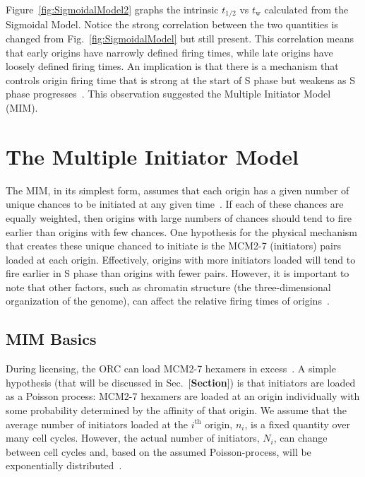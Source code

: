 {	Figure~\ref{fig:SigmoidalModel2} graphs the intrinsic $t_{1/2}$ vs $t_{\text{w}}$ calculated from the Sigmoidal Model.
	Notice the strong correlation between the two quantities is changed from Fig.~\ref{fig:SigmoidalModel} but still present.
	This correlation means that early origins have narrowly defined firing times, while late origins have loosely defined firing times.
	An implication is that there is a mechanism that controls origin firing time that is strong at the start of S phase but weakens as S phase progresses~\cite{ScottsThesis}.
	This observation suggested the Multiple Initiator Model (MIM).
	
	
	
	\section{The Multiple Initiator Model}
	\label{sec:MIM}
	
	The MIM, in its simplest form, assumes that each origin has a given number of unique chances to be initiated at any given time~\cite{ScottsThesis}.
	If each of these chances are equally weighted, then origins with large numbers of chances should tend to fire earlier than origins with few chances.
	One hypothesis for the physical mechanism that creates these unique chanced to initiate is the MCM2-7 (initiators) pairs loaded at each origin.
	Effectively, origins with more initiators loaded will tend to fire earlier in S phase than origins with fewer pairs.
	However, it is important to note that other factors, such as chromatin structure (the three-dimensional organization of the genome), can affect the relative firing times of origins~\cite{Chromatin}.
	
		\subsection{MIM Basics}
		\label{subsec:MIMBasics}
		During licensing, the ORC can load MCM2-7 hexamers in excess~\cite{MultiMCM}.
		A simple hypothesis (that will be discussed in Sec.~[\textbf{Section}]) is that initiators are loaded as a Poisson process:
		MCM2-7 hexamers are loaded at an origin individually with some probability determined by the affinity of that origin.
		We assume that the average number of initiators loaded at the $i^{\text{th}}$ origin, $n_i$, is a fixed quantity over many cell cycles.
		However, the actual number of initiators, $N_i$, can change between cell cycles and, based on the assumed Poisson-process, will be exponentially distributed~\cite{PoissonExponential}.
		
}
